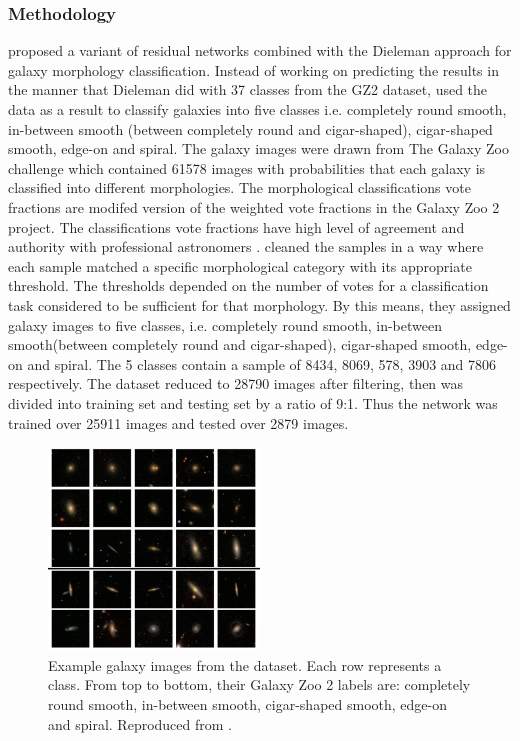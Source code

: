 \documentclass[a4paper,12pt]{report}
\begin{document}
\subsubsection{Methodology}
\hspace*{0.5 in}\citet{dai2018galaxy} proposed a variant of residual networks combined with the Dieleman approach for galaxy morphology classification. Instead of working on predicting the results in the manner that Dieleman did with 37 classes from the GZ2 dataset, \citet{dai2018galaxy} used the data as a result to classify galaxies into five classes i.e. completely round smooth, in-between smooth (between completely round and cigar-shaped), cigar-shaped smooth, edge-on and spiral. The galaxy images were drawn from The Galaxy Zoo challenge \citep{Willett_2013} which contained 61578 images with probabilities that each galaxy is classified into different morphologies. The morphological classifications vote fractions are modifed version of the weighted vote fractions in the Galaxy Zoo 2 project. The classifications vote fractions have high level of agreement and authority with professional astronomers \citep{Willett_2013}. \citet{dai2018galaxy} cleaned the samples in a way where each sample matched a specific morphological category with its appropriate threshold. The thresholds depended on the number of votes for a classification task considered to be sufficient for that morphology. By this means, they assigned galaxy images to five classes, i.e. completely round smooth, in-between smooth(between completely round and cigar-shaped), cigar-shaped smooth, edge-on and spiral. The 5 classes contain a sample of 8434, 8069, 578, 3903 and 7806 respectively. The dataset reduced to 28790 images after filtering, then
was divided into training set and testing set by a ratio of 9:1. Thus the network was trained over 25911 images and tested over 2879 images.\\
\begin{figure}[H]
    \centering
    \includegraphics[width=0.5\textwidth]{figures/DaiClasses.jpeg}
    \caption{Example galaxy images from the dataset. Each row represents a class. From top to bottom, their Galaxy Zoo 2 labels are: completely round smooth, in-between smooth, cigar-shaped smooth, edge-on and spiral. Reproduced from \citep{dai2018galaxy}.}
    \label{DaiClasses}
\end{figure}
\end{document}
